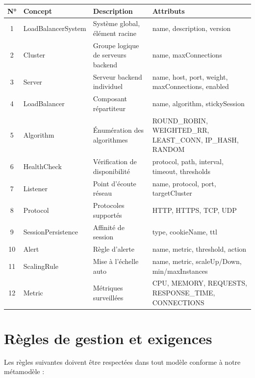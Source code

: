\documentclass[12pt,a4paper]{report}
\begin{document}
\begin{longtable}{|c|p{3.5cm}|p{5cm}|p{4.5cm}|}
\hline
\textbf{N°} & \textbf{Concept} & \textbf{Description} & \textbf{Attributs} \\
\hline
\endhead
1 & LoadBalancerSystem & Système global, élément racine & name, description, version \\
\hline
2 & Cluster & Groupe logique de serveurs backend & name, maxConnections \\
\hline
3 & Server & Serveur backend individuel & name, host, port, weight, maxConnections, enabled \\
\hline
4 & LoadBalancer & Composant répartiteur & name, algorithm, stickySession \\
\hline
5 & Algorithm & Énumération des algorithmes & ROUND\_ROBIN, WEIGHTED\_RR, LEAST\_CONN, IP\_HASH, RANDOM \\
\hline
6 & HealthCheck & Vérification de disponibilité & protocol, path, interval, timeout, thresholds \\
\hline
7 & Listener & Point d'écoute réseau & name, protocol, port, targetCluster \\
\hline
8 & Protocol & Protocoles supportés & HTTP, HTTPS, TCP, UDP \\
\hline
9 & SessionPersistence & Affinité de session & type, cookieName, ttl \\
\hline
10 & Alert & Règle d'alerte & name, metric, threshold, action \\
\hline
11 & ScalingRule & Mise à l'échelle auto & name, metric, scaleUp/Down, min/maxInstances \\
\hline
12 & Metric & Métriques surveillées & CPU, MEMORY, REQUESTS, RESPONSE\_TIME, CONNECTIONS \\
\hline
\end{longtable}

\chapter{Règles de gestion et exigences}

Les règles suivantes doivent être respectées dans tout modèle conforme à notre métamodèle :
\end{document}
